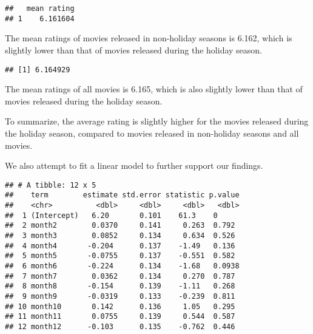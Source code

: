 \documentclass[
]{article}
\newenvironment{Shaded}{\begin{snugshade}}{\end{snugshade}}
\newcommand{\AttributeTok}[1]{\textcolor[rgb]{0.77,0.63,0.00}{#1}}
\newcommand{\CommentTok}[1]{\textcolor[rgb]{0.56,0.35,0.01}{\textit{#1}}}
\newcommand{\ConstantTok}[1]{\textcolor[rgb]{0.00,0.00,0.00}{#1}}
\newcommand{\FunctionTok}[1]{\textcolor[rgb]{0.00,0.00,0.00}{#1}}
\newcommand{\NormalTok}[1]{#1}
\newcommand{\OtherTok}[1]{\textcolor[rgb]{0.56,0.35,0.01}{#1}}
\newcommand{\SpecialCharTok}[1]{\textcolor[rgb]{0.00,0.00,0.00}{#1}}
\newcommand{\StringTok}[1]{\textcolor[rgb]{0.31,0.60,0.02}{#1}}
\begin{document}
\begin{verbatim}
##   mean rating
## 1    6.161604
\end{verbatim}

The mean ratings of movies released in non-holiday seasons is 6.162,
which is slightly lower than that of movies released during the holiday
season.

\begin{Shaded}
\end{Shaded}

\begin{verbatim}
## [1] 6.164929
\end{verbatim}

The mean ratings of all movies is 6.165, which is also slightly lower
than that of movies released during the holiday season.

To summarize, the average rating is slightly higher for the movies
released during the holiday season, compared to movies released in
non-holiday seasons and all movies.

We also attempt to fit a linear model to further support our findings.

\begin{Shaded}
\end{Shaded}

\begin{verbatim}
## # A tibble: 12 x 5
##    term        estimate std.error statistic p.value
##    <chr>          <dbl>     <dbl>     <dbl>   <dbl>
##  1 (Intercept)   6.20       0.101    61.3    0     
##  2 month2        0.0370     0.141     0.263  0.792 
##  3 month3        0.0852     0.134     0.634  0.526 
##  4 month4       -0.204      0.137    -1.49   0.136 
##  5 month5       -0.0755     0.137    -0.551  0.582 
##  6 month6       -0.224      0.134    -1.68   0.0938
##  7 month7        0.0362     0.134     0.270  0.787 
##  8 month8       -0.154      0.139    -1.11   0.268 
##  9 month9       -0.0319     0.133    -0.239  0.811 
## 10 month10       0.142      0.136     1.05   0.295 
## 11 month11       0.0755     0.139     0.544  0.587 
## 12 month12      -0.103      0.135    -0.762  0.446
\end{verbatim}
\end{document}
